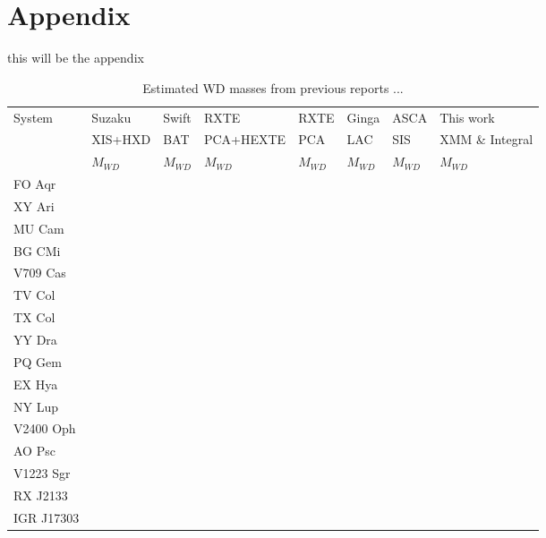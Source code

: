 \documentclass[oneside,a4paper,11pt]{report}
\begin{document}
\clearpage

\appendix
\section*{Appendix}
this will be the appendix



\begin{table}
\begin{center}
 

\caption{Estimated WD masses from previous reports ...}
\begin{tabular}{llllllll}
\hline
\hline
System & Suzaku & Swift & RXTE & RXTE & Ginga & ASCA& This work  \\
       & XIS+HXD & BAT& PCA+HEXTE & PCA & LAC & SIS & XMM \& Integral                     \\
       & $M_{WD}$ &$M_{WD}$ &$M_{WD} $&$M_{WD}$ &$M_{WD}$ &$M_{WD}$ &$M_{WD}$ \\
\hline
 FO Aqr      &         &        &          &     &      &         &           \\
 XY Ari      &         &        &          &     &      &         &           \\
 MU Cam      &         &        &          &     &      &         &           \\
 BG CMi&         &        &          &     &      &         &           \\
 V709 Cas&         &        &          &     &      &         &           \\
 TV Col&         &        &          &     &      &         &           \\
 TX Col&         &        &          &     &      &         &           \\
 YY Dra&         &        &          &     &      &         &           \\
 PQ Gem&         &        &          &     &      &         &           \\
 EX Hya&         &        &          &     &      &         &           \\
 NY Lup&         &        &          &     &      &         &           \\
 V2400 Oph&         &        &          &     &      &         &           \\
 AO Psc&         &        &          &     &      &         &           \\
 V1223 Sgr&         &        &          &     &      &         &           \\
 RX J2133&         &        &          &     &      &         &           \\
 IGR J17303&         &        &          &     &      &         &           \\

\hline
\end{tabular}

\end{center}
\end{table}
\end{document}
